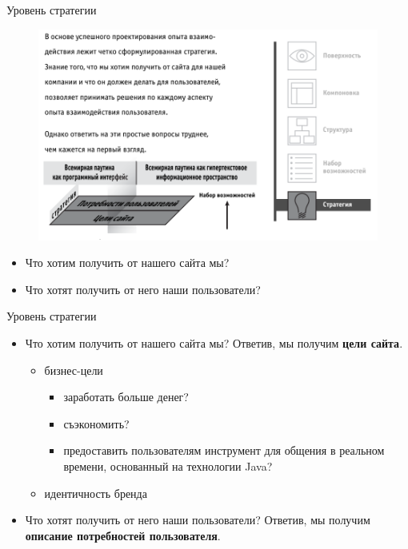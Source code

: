 \documentclass{beamer}
\begin{document}
\begin{frame}{Уровень стратегии}
\begin{figure}[h]
\centering
\includegraphics[scale=0.4]{images/lec01-pic13.png}
\end{figure}
\begin{itemize}
\item Что хотим получить от нашего сайта мы?
\item Что хотят получить от него наши пользователи?
\end{itemize}
\end{frame}

\begin{frame}{Уровень стратегии}
\begin{itemize}
\item Что хотим получить от нашего сайта мы? Ответив, мы получим \textbf{цели сайта}. 
	\begin{itemize}
	\item бизнес-цели
	\begin{itemize}
		\item заработать больше денег?
		\item съэкономить?		
		\item предоставить пользователям инструмент для общения в реальном времени, основанный на технологии Java?		
	\end{itemize}
	\item идентичность бренда
	\end{itemize}
\item Что хотят получить от него наши пользователи? Ответив, мы получим \textbf{описание потребностей пользователя}. 
\end{itemize}
\end{frame}
\end{document}
